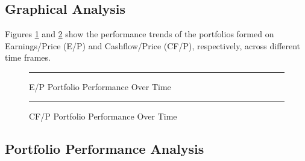 \documentclass{article}
\begin{document}
\subsection*{Graphical Analysis}

Figures \ref{fig:graph1} and \ref{fig:graph2} show the performance trends of the portfolios formed on Earnings/Price (E/P) and Cashflow/Price (CF/P), respectively, across different time frames.

\begin{figure}[ht]
\centering
\rule{0.8\textwidth}{0.4\textwidth} %
\caption{E/P Portfolio Performance Over Time}
\label{fig:graph1}
\end{figure}

\begin{figure}[ht]
\centering
\rule{0.8\textwidth}{0.4\textwidth} %
\caption{CF/P Portfolio Performance Over Time}
\label{fig:graph2}
\end{figure}

\subsection*{Portfolio Performance Analysis}
\end{document}

